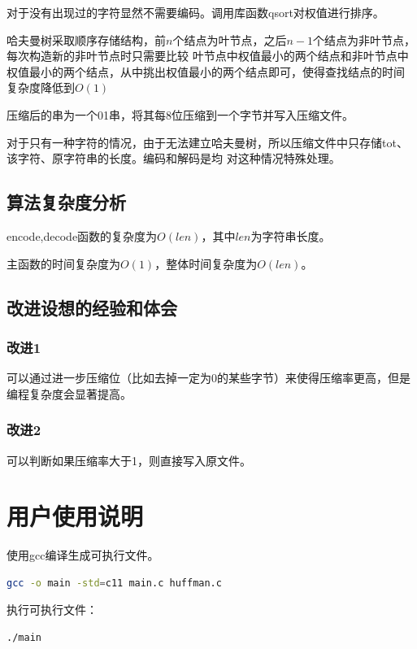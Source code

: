 \documentclass{article}
\begin{document}
对于没有出现过的字符显然不需要编码。调用库函数qsort对权值进行排序。

哈夫曼树采取顺序存储结构，前$n$个结点为叶节点，之后$n-1$个结点为非叶节点，每次构造新的非叶节点时只需要比较
叶节点中权值最小的两个结点和非叶节点中权值最小的两个结点，从中挑出权值最小的两个结点即可，使得查找结点的时间
复杂度降低到$O(1)$

压缩后的串为一个01串，将其每8位压缩到一个字节并写入压缩文件。

对于只有一种字符的情况，由于无法建立哈夫曼树，所以压缩文件中只存储tot、该字符、原字符串的长度。编码和解码是均
对这种情况特殊处理。

\subsection{算法复杂度分析}

encode,decode函数的复杂度为$O(len)$，其中$len$为字符串长度。

主函数的时间复杂度为$O(1)$，整体时间复杂度为$O(len)$。

\subsection{改进设想的经验和体会}

\subsubsection{改进1}

可以通过进一步压缩位（比如去掉一定为0的某些字节）来使得压缩率更高，但是编程复杂度会显著提高。

\subsubsection{改进2}

可以判断如果压缩率大于1，则直接写入原文件。

\section{用户使用说明}

使用gcc编译生成可执行文件。

\begin{lstlisting}[language={bash},
    basicstyle=\small\consolas]
gcc -o main -std=c11 main.c huffman.c
\end{lstlisting}

执行可执行文件：

\begin{lstlisting}[language={bash},
    basicstyle=\small\consolas]
./main
\end{lstlisting}
\end{document}
